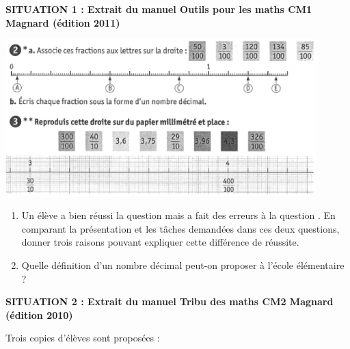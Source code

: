 \bigskip


\begin{exercice}[CRPE 2015 G1]
{\bf SITUATION 1 : Extrait du manuel \og Outils pour les maths \fg{} CM1 Magnard (édition 2011)}
\begin{center}
   \includegraphics[width=12cm]{Nombres_et_calculs_did/Images/Num4_analyse_droite_sujet}
\end{center}
\vspace*{-8mm}
\begin{enumerate}
   \item Un élève a bien réussi la question  mais a fait des erreurs à la question . En comparant la présentation et les tâches demandées dans ces deux questions, donner trois raisons pouvant expliquer cette différence de réussite. 
   \item Quelle définition d'un nombre décimal peut-on proposer à l'école élémentaire ?
\end{enumerate}
{\bf SITUATION 2 : Extrait du manuel \og Tribu des maths \fg{} CM2 Magnard (édition 2010)}
\begin{center}
\end{center}
Trois copies d'élèves sont proposées : 
\begin{center}
    \\

\end{center}
\end{exercice}

